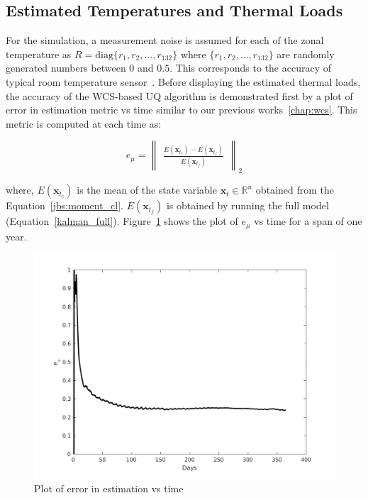 \subsection{Estimated Temperatures and Thermal Loads}

For the simulation, a measurement noise is assumed for each of the zonal temperature as $R = \text{diag}\lbrace r_1, r_2, \ldots, r_{132} \rbrace$ where $\lbrace r_1, r_2, \ldots, r_{132} \rbrace$ are randomly generated numbers between 0 and $0.5$. This corresponds to the accuracy of typical room temperature sensor~\citep{siemens2013catalog}. 
Before displaying the estimated thermal loads, the accuracy of the WCS-based UQ algorithm is demonstrated first by a plot of error in estimation metric vs time similar to our previous works~\ref{chap:wcs}. This metric is computed at each time as:

\begin{equation}
\label{jbs:err_metric}
e_{\mu} = \begin{Vmatrix}
\frac{E(\textbf{x}_{t_c}) - E(\textbf{x}_{t_f})}{E(\textbf{x}_{t_f})}
\end{Vmatrix}_2
\end{equation}

\noindent where, $E(\textbf{x}_{t_c})$ is the mean of the state variable $\textbf{x}_t \in \mathbb{R}^n$ obtained from the Equation~\ref{jbs:moment_cl}. $E(\textbf{x}_{t_f})$ is obtained by running the full model (Equation~\ref{kalman_full}). Figure~\ref{jbs:fig:error} shows the plot of $e_{\mu}$ vs time for a span of one year.  


\begin{figure}[H]
\centering
\includegraphics[width=\textwidth]{jbs_figures/fig2}
\caption{Plot of error in estimation vs time}
\label{jbs:fig:error}
\end{figure}

